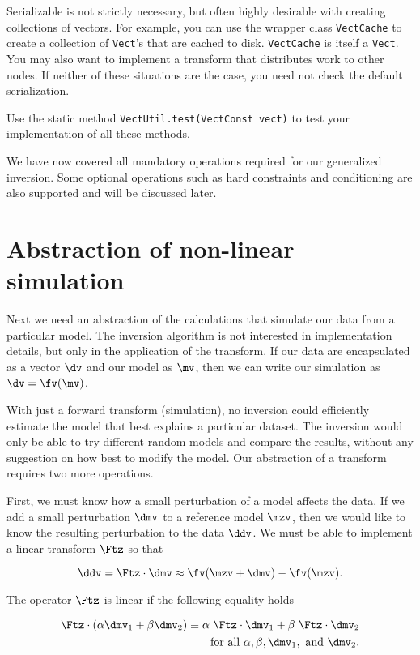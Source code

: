 \documentclass[12pt]{article}
\begin{document}
Serializable is not strictly necessary, but
often highly desirable with creating
collections of vectors.  For example, you can
use the wrapper class \texttt{VectCache} to
create a collection of \texttt{Vect}'s that
are cached to disk.  \texttt{VectCache} is
itself a \texttt{Vect}.  You may also want to
implement a transform that distributes work
to other nodes.  If neither of these
situations are the case, you need not check
the default serialization.

Use the static method
\texttt{VectUtil.test(VectConst vect)} to
test your implementation of all these
methods.

We have now covered all mandatory operations
required for our generalized inversion.  Some
optional operations such as hard constraints
and conditioning are also supported and will
be discussed later.

\section {Abstraction of non-linear
simulation}

Next we need an abstraction of the
calculations that simulate our data from a
particular model.  The inversion algorithm is
not interested in implementation details, but
only in the application of the transform.  If
our data are encapsulated as a vector $\dv$
and our model as $\mv$, then we can write our
simulation as $\dv = \fv ( \mv )$.

With just a forward transform (simulation),
no inversion could efficiently estimate the
model that best explains a particular
dataset.  The inversion would only be able to
try different random models and compare the
results, without any suggestion on how best
to modify the model.  Our abstraction of a
transform requires two more operations.

First, we must know how a small perturbation
of a model affects the data.  If we add a
small perturbation $\dmv$ to a reference
model $\mzv$, then we would like to know the
resulting perturbation to the data $\ddv$.
We must be able to implement a linear
transform $\Ftz$ so that

\begin{equation}
\ddv = \Ftz  \cdot \dmv \approx \fv (\mzv + \dmv) - \fv ( \mzv ) .  
\end{equation}

\noindent The operator $\Ftz$ is linear if
the following equality holds

\begin{eqnarray}
\Ftz \cdot (\alpha \dmv_1 + \beta \dmv_2)
  \equiv \alpha ~ \Ftz \cdot \dmv_1 + \beta ~ \Ftz \cdot \dmv_2 \\ 
~\mbox{for all}~ \alpha, \beta, \dmv_1, ~\mbox{and}~ \dmv_2 .
\nonumber 
\end{eqnarray}
\end{document}
